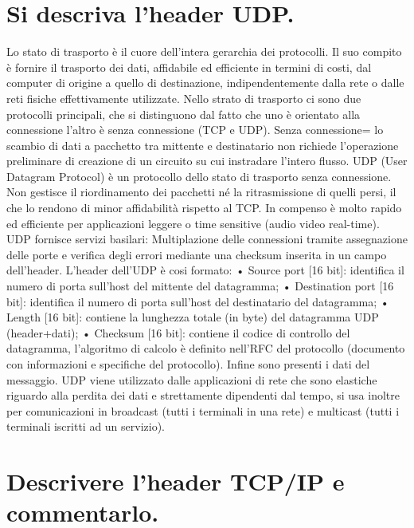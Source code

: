 \section{Si descriva l’header UDP.}
Lo stato di trasporto è il cuore dell’intera gerarchia dei protocolli. Il suo compito è fornire il trasporto dei dati, affidabile ed efficiente in termini di costi, dal computer di origine a quello di destinazione, indipendentemente dalla rete o dalle reti fisiche effettivamente utilizzate.
Nello strato di trasporto ci sono due protocolli principali, che si distinguono dal fatto che uno è orientato alla connessione l’altro è senza connessione (TCP e UDP).
Senza connessione= lo scambio di dati a pacchetto tra mittente e destinatario non richiede l’operazione preliminare di creazione di un circuito su cui instradare l’intero flusso.
UDP (User Datagram Protocol) è un protocollo dello stato di trasporto senza connessione. Non gestisce il riordinamento dei pacchetti né la ritrasmissione di quelli persi, il che lo rendono di minor affidabilità rispetto al TCP. In compenso è molto rapido ed efficiente per applicazioni leggere o time sensitive (audio video real-time).
UDP fornisce servizi basilari: Multiplazione delle connessioni tramite assegnazione delle porte e verifica degli errori mediante una checksum inserita in un campo dell’header.
L’header dell’UDP è cosi formato:
•	Source port [16 bit]: identifica il numero di porta sull’host del mittente del datagramma;
•	Destination port [16 bit]: identifica il numero di porta sull’host del destinatario del datagramma;
•	Length [16 bit]: contiene la lunghezza totale (in byte) del datagramma UDP (header+dati);
•	Checksum [16 bit]: contiene il codice di controllo del datagramma, l’algoritmo di calcolo è definito nell’RFC del protocollo (documento con informazioni e specifiche del protocollo).
Infine sono presenti i dati del messaggio.
UDP viene utilizzato dalle applicazioni di rete che sono elastiche riguardo alla perdita dei dati e strettamente dipendenti dal tempo, si usa inoltre per comunicazioni in broadcast (tutti i terminali in una rete) e multicast (tutti i terminali iscritti ad un servizio).
 

\section{Descrivere l’header TCP/IP e commentarlo.}


